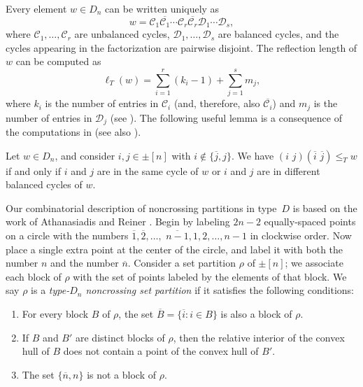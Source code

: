 \documentclass[ALCO,ThmDefs,Unicode,epreuves]{cedram}
\newcommand{\darkblue}{\color{darkblue}}
\newcommand{\defn}[1]{\emph{\darkblue #1}}
\begin{document}
Every element $w\in D_n$ can be written uniquely as 
\[
w=\mathcal C_1\overline{\mathcal C_1}\cdots\mathcal C_r\overline{\mathcal C_r}\mathcal D_1\cdots\mathcal D_s,
\]
 where $\mathcal C_1,\ldots,\mathcal C_r$ are unbalanced cycles, $\mathcal D_1,\ldots,\mathcal D_s$ are balanced cycles, and the cycles appearing in the factorization are pairwise disjoint. The reflection length of $w$ can be computed as 
\[
\ell_T(w)=\sum_{i=1}^r(k_i-1)+\sum_{j=1}^sm_j,
\]
 where $k_i$ is the number of entries in $\mathcal C_i$ (and, therefore, also $\overline{\mathcal C_i}$) and $m_j$ is the number of entries in $\mathcal D_j$ (see \cite[Section~3]{BradyWatt}). The following useful lemma is a consequence of the computations in \cite[Example~3.6]{BradyWatt} (see also \cite[Section~3]{AthanasiadisReiner}).

\begin{lemma}\label{Lem1}
Let $w\in D_n$, and consider $i,j\in\pm[n]$ with $i\not\in\{\overline j,j\}$. We have $(i\,\,j)(\overline i\,\,\overline j)\leq_T w$ if and only if $i$ and $j$ are in the same cycle of $w$ or $i$ and $j$ are in different balanced cycles of $w$. 
\end{lemma}

Our combinatorial description of noncrossing partitions in type~$D$ is based on the work of Athanasiadis and Reiner \cite{AthanasiadisReiner}. Begin by labeling $2n{-}2$ equally-spaced points on a circle with the numbers $\overline 1,\overline 2,\ldots,$ $\overline{n-1},1,2,\ldots,n-1$ in clockwise order. Now place a single extra point at the center of the circle, and label it with both the number $n$ and the number $\overline n$. Consider a set partition $\rho$ of $\pm[n]$; we associate each block of $\rho$ with the set of points labeled by the elements of that block. We say $\rho$ is a \defn{type-$D_n$ noncrossing set partition} if it satisfies the following conditions: 


\begin{enumerate}
    \item\label{sect5_1} For every block $B$ of $\rho$, the set $\overline B=\{\overline i:i\in B\}$ is also a block of $\rho$.
    \item\label{sect5_2} If $B$ and $B'$ are distinct blocks of $\rho$, then the relative interior of the convex hull of $B$ does not contain a point of the convex hull of $B'$. 
    \item\label{sect5_3} The set $\{\overline n,n\}$ is not a block of $\rho$. 
\end{enumerate}
\end{document}
